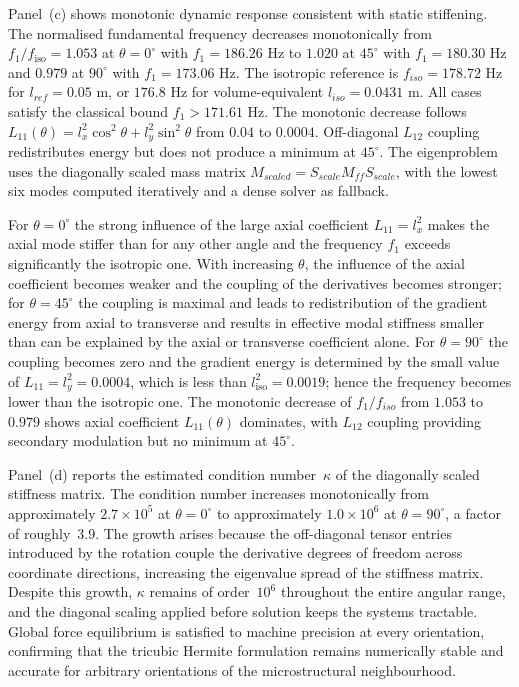 \documentclass[final,3p,times,fleqn]{elsarticle}
\begin{document}
Panel~(c) shows monotonic dynamic response consistent with static stiffening.
The normalised fundamental frequency decreases monotonically from $f_{1}/f_{\mathrm{iso}}=1.053$ at $\theta=0^{\circ}$ with $f_1=186.26$ Hz to $1.020$ at $45^{\circ}$ with $f_1=180.30$ Hz and $0.979$ at $90^{\circ}$ with $f_1=173.06$ Hz. The isotropic reference is $f_{iso}=178.72$ Hz for $l_{ref}=0.05$ m, or $176.8$ Hz for volume-equivalent $l_{iso}=0.0431$ m. All cases satisfy the classical bound $f_1>171.61$ Hz. The monotonic decrease follows $L_{11}(\theta)=l_x^2\cos^2\theta+l_y^2\sin^2\theta$ from $0.04$ to $0.0004$. Off-diagonal $L_{12}$ coupling redistributes energy but does not produce a minimum at $45^{\circ}$. The eigenproblem uses the diagonally scaled mass matrix $M_{scaled}=S_{scale}M_{ff}S_{scale}$, with the lowest six modes computed iteratively and a dense solver as fallback.

For $\theta = 0^{\circ}$ the strong influence of the large axial coefficient
$L_{11} = l_{x}^{2}$ makes the axial
mode stiffer than for any other angle and the frequency $f_{1}$ exceeds
significantly the isotropic one.
With increasing $\theta$, the influence of the axial coefficient becomes weaker and the
coupling of the derivatives becomes stronger; for $\theta = 45^{\circ}$ the coupling is maximal and
leads to redistribution of the gradient energy from axial to transverse and results in effective
modal stiffness smaller than can be explained by the axial or transverse coefficient alone.
For $\theta = 90^{\circ}$ the coupling becomes zero and the gradient energy is determined
by the small value of $L_{11} = l_{y}^{2} = 0.0004$,
which is less than $l_{\mathrm{iso}}^{2} = 0.0019$; hence the frequency becomes lower than
the isotropic one.
The monotonic decrease of $f_1/f_{iso}$ from $1.053$ to $0.979$ shows axial coefficient $L_{11}(\theta)$ dominates, with $L_{12}$ coupling providing secondary modulation but no minimum at $45^{\circ}$. 

Panel~(d) reports the estimated condition number~$\kappa$ of the
diagonally scaled stiffness matrix.
The condition number increases monotonically from approximately
$2.7\times10^{5}$ at $\theta = 0^{\circ}$ to approximately
$1.0\times10^{6}$ at $\theta = 90^{\circ}$, a factor of roughly~$3.9$.
The growth arises because the off-diagonal tensor entries introduced by
the rotation couple the derivative degrees of freedom across coordinate
directions, increasing the eigenvalue spread of the stiffness matrix.
Despite this growth, $\kappa$ remains of order~$10^{6}$ throughout the
entire angular range, and the diagonal scaling applied before solution
keeps the systems tractable.
Global force equilibrium is satisfied to machine precision at every
orientation, confirming that the tricubic Hermite formulation remains
numerically stable and accurate for arbitrary orientations of the
microstructural neighbourhood.
\end{document}
